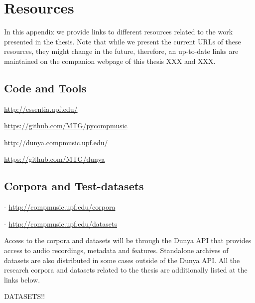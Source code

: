 \chapter{Resources}\label{app:resources}

In this appendix we provide links to different resources related to the work presented in the thesis. Note that while we present the current URLs of these resources, they might change in the future, therefore, an up-to-date links are maintained on the companion webpage of this thesis XXX and XXX.

\section*{Code and Tools}

\begin{description}[style=nextline]
	\item[Essentia audio analysis library] \url{http://essentia.upf.edu/}
	\item[Dunya API] \url{https://github.com/MTG/pycompmusic}
	\item[Dunya front end] \url{http://dunya.compmusic.upf.edu/}
	\item[Dunya server and back end] \url{https://github.com/MTG/dunya}

\end{description}


\section*{Corpora and Test-datasets}


\begin{description}[style=nextline]
	\item[Research corpora] - \url{http://compmusic.upf.edu/corpora}
	\item[Test datasets] - \url{http://compmusic.upf.edu/datasets}
\end{description}


Access to the corpora and datasets will be through the Dunya API that provides access to audio recordings, metadata and features. Standalone archives of datasets are also distributed in some cases outside of the Dunya API. All the research corpora and datasets related to the thesis are additionally listed at the links below. 

% 
% 
% 
%
%
DATASETS!!

